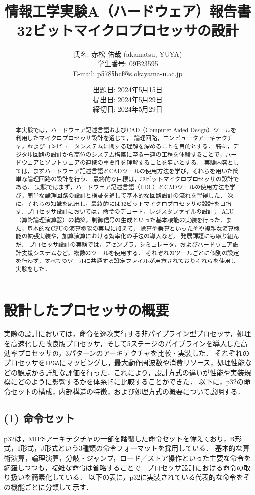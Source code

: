 \documentclass[autodetect-engine,dvi=dvipdfmx,ja=standard,
               a4j,11pt]{bxjsarticle}
\title{{\normalsize 情報工学実験A（ハードウェア）報告書}\\
        32ビットマイクロプロセッサの設計    }
\author{氏名: 赤松 佑哉 (akamatsu, YUYA) \\
        学生番号: 09B23595\\
        E-mail: p5785hcf@s.okayama-u.ac.jp}
\date{出題日: 2024年5月15日 \\
      提出日: 2024年5月29日 \\
      締切日: 2024年5月29日 \\}  %
\begin{document}
\maketitle
\begin{abstract}
本実験では，ハードウェア記述言語およびCAD（Computer Aided Design）ツールを利用したマイクロプロセッサ設計を通じて，
論理回路，コンピュータアーキテクチャ，およびコンピュータシステムに関する理解を深めることを目的とする．
特に，デジタル回路の設計から高位のシステム構築に至る一連の工程を体験することで，ハードウェアとソフトウェアの連携の重要性を理解することを狙いとする．
実験内容としては，まずハードウェア記述言語とCADツールの使用方法を学び，それらを用いた簡単な論理回路の設計を行う．
最終的な目標は，32ビットマイクロプロセッサの設計である．
実験ではまず，ハードウェア記述言語（HDL）とCADツールの使用方法を学び，簡単な論理回路の設計と検証を通して基本的な回路設計の流れを習得した．
次に，それらの知識を応用し，最終的には32ビットマイクロプロセッサの設計を目指す．プロセッサ設計においては，命令のデコード，レジスタファイルの設計，
ALU（算術論理演算器）の構築，制御信号の生成といった基本機能の実装を行った．また，基本的なCPUの演算機能の実現に加えて，
除算や乗算といったやや複雑な演算機能の拡張実装や，加算演算における効率化の手法の導入など，
発展課題にも取り組んだ．
プロセッサ設計の実験では，アセンブラ，シミュレータ，およびハードウェア設計支援システムなど，複数のツールを使用する．
それぞれのツールごとに個別の設定を行わず，すべてのツールに共通する設定ファイルが用意されておりそれらを使用し実験をした．
\end{abstract}
\section{設計したプロセッサの概要}
実際の設計においては，命令を逐次実行する非パイプライン型プロセッサ，処理を高速化した改良版プロセッサ，そして5ステージのパイプラインを導入した高効率プロセッサの，3パターンのアーキテクチャを比較・実装した．
それぞれのプロセッサを\verb|FPGA|にマッピングし，最大動作周波数や消費リソース，処理性能などの観点から詳細な評価を行った．これにより，設計方式の違いが性能や実装規模にどのように影響するかを体系的に比較することができた．
以下に，p32の命令セットの構成，内部構造の特徴，および処理方式の概要について説明する．

\subsection*{(1) 命令セット}
p32は，MIPSアーキテクチャの一部を踏襲した命令セットを備えており，R形式，I形式，J形式という3種類の命令フォーマットを採用している．
基本的な算術演算，論理演算，分岐・ジャンプ，ロード／ストア操作といった主要な命令を網羅しつつも，複雑な命令は省略することで，プロセッサ設計における命令の取り扱いを簡素化している．
以下の表に，p32に実装されている代表的な命令をその機能ごとに分類して示す．
\end{document}
